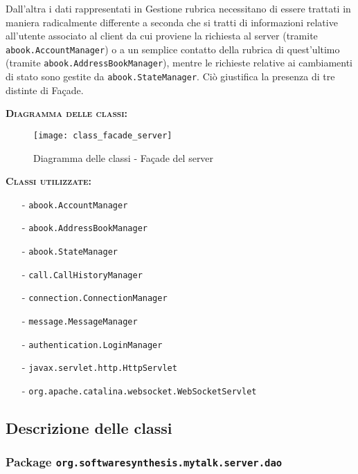 \begin{description}
Dall'altra i dati rappresentati in \textsf{Gestione rubrica} necessitano di essere trattati in maniera radicalmente differente a seconda che si tratti di informazioni relative all'utente associato al client da cui proviene la richiesta al server (tramite \texttt{abook.AccountManager}) o a un semplice contatto della rubrica di quest'ultimo (tramite \texttt{abook.AddressBookManager}), mentre le richieste relative ai cambiamenti di stato sono gestite da \texttt{abook.StateManager}. Ciò giustifica la presenza di tre distinte  di Façade.

	\item{\scshape\bfseries Diagramma delle classi:}
\begin{figure}[H]
  \centering
  \texttt{[image: class\_facade\_server]}
  \caption{Diagramma delle classi - Façade del server}\label{fig:facadeserver}
\end{figure}	
	
	\item{\scshape\bfseries Classi utilizzate:}\\
	\begin{itemize}[noitemsep,nolistsep]
	  \item[-] \texttt{abook.AccountManager}
	  \item[-] \texttt{abook.AddressBookManager}
	  \item[-] \texttt{abook.StateManager}
	  \item[-] \texttt{call.CallHistoryManager}
	  \item[-] \texttt{connection.ConnectionManager}
	  \item[-] \texttt{message.MessageManager}
    \item[-] \texttt{authentication.LoginManager}
	  \item[-] \texttt{javax.servlet.http.HttpServlet}
	  \item[-] \texttt{org.apache.catalina.websocket.WebSocketServlet}
	\end{itemize}
\end{description}

\subsection{Descrizione delle classi}

\subsubsection{Package \texttt{org.softwaresynthesis.mytalk.server.dao}}

